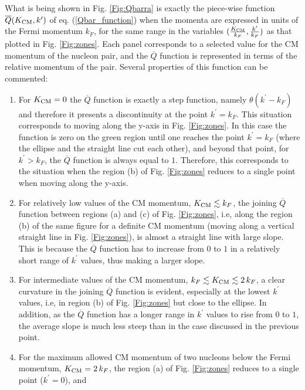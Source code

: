 \documentclass[aps,twocolumn,showpacs,preprintnumbers,amsmath,amssymb,nofootinbib,superscriptaddress,showkeys,noeprint]{revtex4-1}
\begin{document}
What is being shown in Fig. \ref{Fig:Qbarra} is exactly the piece-wise
function $\overline{Q}(K_{\rm CM},k^\prime)$ of
eq. (\ref{Qbar_function}) when the momenta are expressed in units of
the Fermi momentum $k_F$, for the same range in the variables
$(\frac{K_{\rm CM}}{k_F},\frac{k^\prime}{k_F})$ as that plotted in
Fig. \ref{Fig:zones}. Each panel corresponds to a selected value for
the CM momentum of the nucleon pair, and the $\overline{Q}$ function
is represented in terms of the relative momentum of the pair. Several
properties of this function can be commented:
\begin{enumerate}
\item For $K_{\rm CM}=0$ the $\overline{Q}$ function is exactly a step
  function, namely $\theta(k^\prime-k_F)$ and therefore it presents a
  discontinuity at the point $k^\prime=k_F$.  This situation
  corresponds to moving along the y-axis in Fig.  \ref{Fig:zones}. In
  this case the function is zero on the green region until one reaches
  the point $k^\prime=k_F$ (where the ellipse and the straight line
  cut each other), and beyond that point, for $k^\prime>k_F$, the
  $\overline{Q}$ function is always equal to $1$.  Therefore, this
  corresponds to the situation when the region (b) of Fig.
  \ref{Fig:zones} reduces to a single point when moving along the
  y-axis.
\item For relatively low values of the CM momentum, $K_{\rm
  CM}\lesssim k_F$, the joining $\overline{Q}$ function between
  regions (a) and (c) of Fig. \ref{Fig:zones}, i.e, along the region
  (b) of the same figure for a definite CM momentum (moving along a
  vertical straight line in Fig. \ref{Fig:zones}), is almost a
  straight line with large slope. This is because the $\overline{Q}$
  function has to increase from $0$ to $1$ in a relatively short range
  of $k^\prime$ values, thus making a larger slope.
\item For intermediate values of the CM momentum, $k_F \lesssim K_{\rm
  CM} \lesssim 2\,k_F$, a clear curvature in the joining
  $\overline{Q}$ function is evident, especially at the lowest
  $k^\prime$ values, i.e, in region (b) of Fig. \ref{Fig:zones} but
  close to the ellipse. In addition, as the $\overline{Q}$ function
  has a longer range in $k^\prime$ values to rise from $0$ to $1$, the
  average slope is much less steep than in the case discussed in the
  previous point.
\item For the maximum allowed CM momentum of two nucleons below the
  Fermi momentum, $K_{\rm CM}=2\,k_F$, the region (a) of
  Fig. \ref{Fig:zones} reduces to a single point ($k^\prime=0$), and

\end{enumerate}
\end{document}
